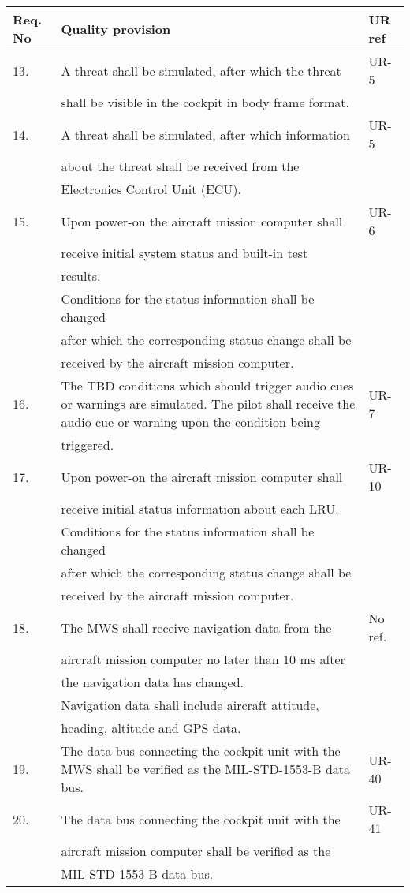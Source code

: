 \begin{center}
    \begin{tabular}{ | l | p{9cm} | l |}
    \hline	  
    Req. No & Quality provision  									& UR ref \\ \hline
		13. & A threat shall be simulated, after which the threat 	& UR-5 \\
			& shall be visible in the cockpit in body frame format. & \\ \hline
		14. & A threat shall be simulated, after which information	& UR-5 \\
			& about the threat shall be received from the 			&\\
			& Electronics Control Unit (ECU). 						&\\ \hline
		15. & Upon power-on the aircraft mission computer shall 	& UR-6 \\
			& receive initial system status and built-in test 		&\\
			& results.												&\\ 	
			& Conditions for the status information shall be changed&\\
			& after which the corresponding status change shall be  &\\
			& received by the aircraft mission computer. 			&\\ \hline
		16. & The TBD conditions which should trigger audio cues or warnings are simulated. The pilot shall receive the  	audio cue or warning upon the condition being  		&UR-7\\				
			& triggered.											&\\ \hline
		17. & Upon power-on the aircraft mission computer shall  	& UR-10 \\
			& receive initial status information about each LRU. 	& \\
			& Conditions for the status information shall be changed&\\
			& after which the corresponding status change shall be 	&\\
			& received by the aircraft mission computer. 			&\\ \hline
		18. & The MWS shall receive navigation data from the 		& No ref. \\
			& aircraft mission computer no later than 10 ms after 	&\\
			& the navigation data has changed. 						&\\
			& Navigation data shall include aircraft attitude, 		&\\
			& heading, altitude and GPS data. 						&\\ \hline
		19. & The data bus connecting the cockpit unit with the MWS shall be verified as the MIL-STD-1553-B data bus. 	&UR-40\\ \hline
		20. & The data bus connecting the cockpit unit with the 	& UR-41 \\
			& aircraft mission computer shall be verified as the  	&\\
			& MIL-STD-1553-B data bus. 								&\\ \hline
    \end{tabular}
\end{center}

